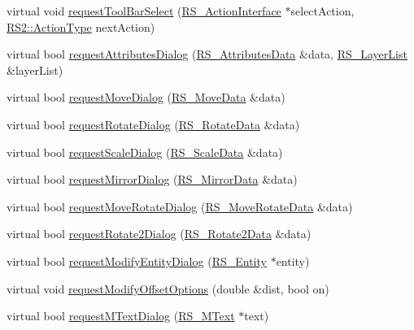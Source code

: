 \begin{DoxyCompactItemize}
\item 
virtual void \hyperlink{classQG__DialogFactory_a01f401e22a5cc5fe559cd8fbf772c51c}{request\-Tool\-Bar\-Select} (\hyperlink{classRS__ActionInterface}{R\-S\-\_\-\-Action\-Interface} $\ast$select\-Action, \hyperlink{classRS2_afe3523e0bc41fd637b892321cfc4b9d7}{R\-S2\-::\-Action\-Type} next\-Action)
\item 
virtual bool \hyperlink{classQG__DialogFactory_a6709cc2b2c62cf35db600f97252eef13}{request\-Attributes\-Dialog} (\hyperlink{classRS__AttributesData}{R\-S\-\_\-\-Attributes\-Data} \&data, \hyperlink{classRS__LayerList}{R\-S\-\_\-\-Layer\-List} \&layer\-List)
\item 
virtual bool \hyperlink{classQG__DialogFactory_afe7b2af979b5a155adab7bfafd41390f}{request\-Move\-Dialog} (\hyperlink{classRS__MoveData}{R\-S\-\_\-\-Move\-Data} \&data)
\item 
virtual bool \hyperlink{classQG__DialogFactory_ab534c8807a9f2f82811832d280ba6927}{request\-Rotate\-Dialog} (\hyperlink{classRS__RotateData}{R\-S\-\_\-\-Rotate\-Data} \&data)
\item 
virtual bool \hyperlink{classQG__DialogFactory_a886a98670acf89fd734f39ff44bdab6e}{request\-Scale\-Dialog} (\hyperlink{classRS__ScaleData}{R\-S\-\_\-\-Scale\-Data} \&data)
\item 
virtual bool \hyperlink{classQG__DialogFactory_aa2bac95a4d80dfba617788e1b775d5af}{request\-Mirror\-Dialog} (\hyperlink{classRS__MirrorData}{R\-S\-\_\-\-Mirror\-Data} \&data)
\item 
virtual bool \hyperlink{classQG__DialogFactory_a327e089f562a4fd187191236600564c4}{request\-Move\-Rotate\-Dialog} (\hyperlink{classRS__MoveRotateData}{R\-S\-\_\-\-Move\-Rotate\-Data} \&data)
\item 
virtual bool \hyperlink{classQG__DialogFactory_a7b13c118c028aece6176fd74aa2e2320}{request\-Rotate2\-Dialog} (\hyperlink{classRS__Rotate2Data}{R\-S\-\_\-\-Rotate2\-Data} \&data)
\item 
virtual bool \hyperlink{classQG__DialogFactory_a44fcd4ccad686822b13f5bc651ed259d}{request\-Modify\-Entity\-Dialog} (\hyperlink{classRS__Entity}{R\-S\-\_\-\-Entity} $\ast$entity)
\item 
virtual void \hyperlink{classQG__DialogFactory_a93a679f2ff125a739fa20df8e21d1b9a}{request\-Modify\-Offset\-Options} (double \&dist, bool on)
\item 
virtual bool \hyperlink{classQG__DialogFactory_a3a0175cfb336f456310ef67ddd5e8cb6}{request\-M\-Text\-Dialog} (\hyperlink{classRS__MText}{R\-S\-\_\-\-M\-Text} $\ast$text)

\end{DoxyCompactItemize}
